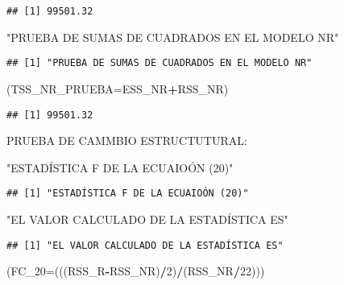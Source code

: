 \documentclass[
]{article}
\newenvironment{Shaded}{\begin{snugshade}}{\end{snugshade}}
\newcommand{\DataTypeTok}[1]{\textcolor[rgb]{0.13,0.29,0.53}{#1}}
\newcommand{\DecValTok}[1]{\textcolor[rgb]{0.00,0.00,0.81}{#1}}
\newcommand{\NormalTok}[1]{#1}
\newcommand{\OperatorTok}[1]{\textcolor[rgb]{0.81,0.36,0.00}{\textbf{#1}}}
\newcommand{\StringTok}[1]{\textcolor[rgb]{0.31,0.60,0.02}{#1}}
\begin{document}
\begin{verbatim}
## [1] 99501.32
\end{verbatim}

\begin{Shaded}
\begin{Highlighting}[]
\StringTok{"PRUEBA DE SUMAS DE CUADRADOS EN EL MODELO NR"}
\end{Highlighting}
\end{Shaded}

\begin{verbatim}
## [1] "PRUEBA DE SUMAS DE CUADRADOS EN EL MODELO NR"
\end{verbatim}

\begin{Shaded}
\begin{Highlighting}[]
\NormalTok{(}\DataTypeTok{TSS_NR_PRUEBA=}\NormalTok{ESS_NR}\OperatorTok{+}\NormalTok{RSS_NR)}
\end{Highlighting}
\end{Shaded}

\begin{verbatim}
## [1] 99501.32
\end{verbatim}

PRUEBA DE CAMMBIO ESTRUCTUTURAL:

\begin{Shaded}
\begin{Highlighting}[]
\StringTok{"ESTADÍSTICA F DE LA ECUAIOÓN (20)"}
\end{Highlighting}
\end{Shaded}

\begin{verbatim}
## [1] "ESTADÍSTICA F DE LA ECUAIOÓN (20)"
\end{verbatim}

\begin{Shaded}
\begin{Highlighting}[]
\StringTok{"EL VALOR CALCULADO DE LA ESTADÍSTICA ES"}
\end{Highlighting}
\end{Shaded}

\begin{verbatim}
## [1] "EL VALOR CALCULADO DE LA ESTADÍSTICA ES"
\end{verbatim}

\begin{Shaded}
\begin{Highlighting}[]
\NormalTok{(}\DataTypeTok{FC_20=}\NormalTok{(((RSS_R}\OperatorTok{-}\NormalTok{RSS_NR)}\OperatorTok{/}\DecValTok{2}\NormalTok{)}\OperatorTok{/}\NormalTok{(RSS_NR}\OperatorTok{/}\DecValTok{22}\NormalTok{)))}
\end{Highlighting}
\end{Shaded}
\end{document}

